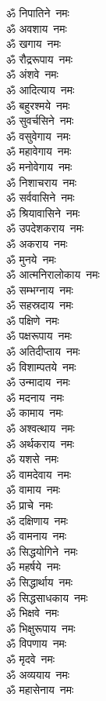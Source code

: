 \begin{multicols}{2}
\begin{flushleft}
ॐ निपातिने~नमः\\
ॐ अवशाय~नमः\\
ॐ खगाय~नमः\\
ॐ रौद्ररूपाय~नमः\\
ॐ अंशवे~नमः\hfill{}\\
ॐ आदित्याय~नमः\\
ॐ बहुरश्मये~नमः\\
ॐ सुवर्चसिने~नमः\\
ॐ वसुवेगाय~नमः\\
ॐ महावेगाय~नमः\\
ॐ मनोवेगाय~नमः\\
ॐ निशाचराय~नमः\\
ॐ सर्ववासिने~नमः\\
ॐ श्रियावासिने~नमः\\
ॐ उपदेशकराय~नमः\hfill{}\\
ॐ अकराय~नमः\\
ॐ मुनये~नमः\\
ॐ आत्मनिरालोकाय~नमः\\
ॐ सम्भग्नाय~नमः\\
ॐ सहस्रदाय~नमः\\
ॐ पक्षिणे~नमः\\
ॐ पक्षरूपाय~नमः\\
ॐ अतिदीप्ताय~नमः\\
ॐ विशाम्पतये~नमः\\
ॐ उन्मादाय~नमः\hfill{}\\
ॐ मदनाय~नमः\\
ॐ कामाय~नमः\\
ॐ अश्वत्थाय~नमः\\
ॐ अर्थकराय~नमः\\
ॐ यशसे~नमः\\
ॐ वामदेवाय~नमः\\
ॐ वामाय~नमः\\
ॐ प्राचे~नमः\\
ॐ दक्षिणाय~नमः\\
ॐ वामनाय~नमः\hfill{}\\
ॐ सिद्धयोगिने~नमः\\
ॐ महर्षये~नमः\\
ॐ सिद्धार्थाय~नमः\\
ॐ सिद्धसाधकाय~नमः\\
ॐ भिक्षवे~नमः\\
ॐ भिक्षुरूपाय~नमः\\
ॐ विपणाय~नमः\\
ॐ मृदवे~नमः\\
ॐ अव्ययाय~नमः\\
ॐ महासेनाय~नमः\hfill{}\\

\end{flushleft}
\end{multicols}
